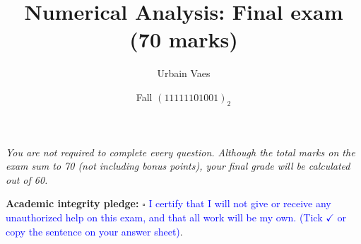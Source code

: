 \documentclass[10pt]{article}
\theoremstyle{definition}
\renewcommand{\mymarks}[1]{\textbf{#1 marks}}
\begin{document}
\title{Numerical Analysis: Final exam {\small (\mymarks{70})}}
\author{Urbain Vaes}
\date{Fall $(11111101001)_2$}
\maketitle

\noindent \emph{You are not required to complete every question.
Although the total marks on the exam sum to 70 (not including bonus points),
your final grade will be calculated out of 60.}
\vspace{.3cm}

\noindent \textbf{Academic integrity pledge:} $\square$ \textcolor{blue}{I certify that I will not give or receive any unauthorized help on this exam,
and that all work will be my own. (Tick $\checkmark$ or copy the sentence on your answer sheet)}.
\vspace{.3cm}
\end{document}
